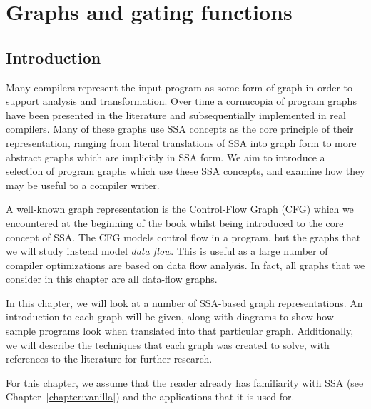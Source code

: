 \chapter{Graphs and gating functions }
\label{chapter:vsdg}


\newcommand{\Gn}{$\gamma$-node}
\newcommand{\Gns}{$\gamma$-nodes}
\newcommand{\Tn}{$\theta$-node}
\newcommand{\Tns}{$\theta$-nodes}
\newcommand{\Ttns}{$\theta^{\mathit{tail}}$-nodes}
\newcommand{\triVM}{\textit{tri}VM}

\newcommand{\instruction}[1]{\texttt{#1}}
\newcommand{\register}[1]{\texttt{v#1}}

\section{Introduction}
Many compilers represent the input program as some form of graph in order to support analysis and transformation. 
Over time a cornucopia of program graphs have been presented in the literature and subsequentially implemented in real compilers. 
Many of these graphs use SSA concepts as the core principle of their representation, ranging from literal translations of SSA into graph form to more abstract graphs which are implicitly in SSA form. 
We aim to introduce a selection of program graphs which use these SSA concepts, and examine how they may be useful to a compiler writer.

A well-known graph representation is the Control-Flow Graph (CFG) which we encountered at the beginning of the book whilst being introduced to the core concept of SSA. The CFG models control flow in a program, but the graphs that we will study instead model \textit{data flow}. This is useful as a large number of compiler optimizations are based on data flow analysis. In fact, all graphs that we consider in this chapter are all data-flow graphs. 

In this chapter, we will look at a number of SSA-based graph representations. An introduction to each graph will be given, along with diagrams to show how sample programs look when translated into that particular graph. Additionally, we will describe the techniques that each graph was created to solve, with references to the literature for further research.

For this chapter, we assume that the reader already has familiarity with SSA (see Chapter~\ref{chapter:vanilla}) and the applications that it is used for.

